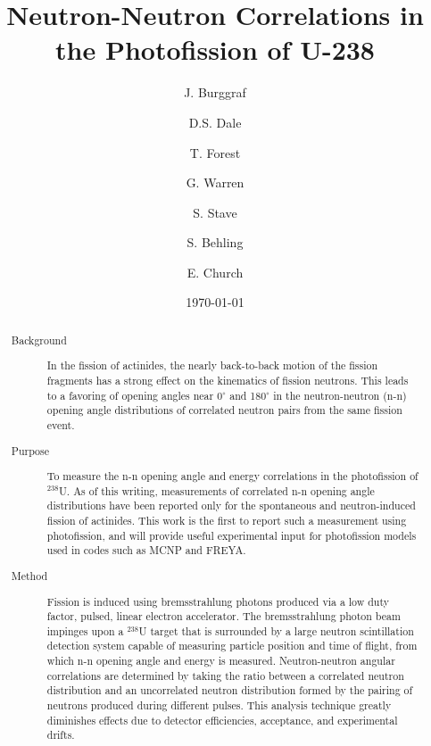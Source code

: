 \documentclass[%
 reprint,
 amsmath,amssymb,
 aps,
 nofootinbib
]{revtex4-1}
\begin{document}

\title{Neutron-Neutron Correlations in the Photofission of U-238
}


\author{J. Burggraf}
\author{D.S. Dale}
\author{T. Forest}

\author{G. Warren}
\author{S. Stave}
\author{S. Behling}
\author{E. Church}

\date{\today}
\begin{abstract}
    \begin{description}
        \item[Background] In the fission of actinides, the nearly back-to-back motion of the fission fragments has a strong effect on the kinematics of fission neutrons.
        This leads to a favoring of opening angles near 0$^{\circ}$ and 180$^{\circ}$ in the neutron-neutron (n-n) opening angle distributions of correlated neutron pairs from the same fission event.
        
        \item[Purpose] To measure the n-n opening angle and energy correlations in the photofission of $^{238}$U.
        As of this writing, measurements of correlated n-n opening angle distributions have been reported only for the spontaneous and neutron-induced fission of actinides.
        This work is the first to report such a measurement using photofission, and will provide useful experimental input for photofission models used in codes such as MCNP and FREYA.

        \item[Method] Fission is induced using bremsstrahlung photons produced via a low duty factor, pulsed, linear electron accelerator.
        The bremsstrahlung photon beam impinges upon a $^{238}$U target that is surrounded by a large neutron scintillation detection system capable of measuring particle position and time of flight, from which n-n opening angle and energy is measured.
Neutron-neutron angular correlations are determined by taking the ratio between a correlated neutron distribution and an uncorrelated neutron distribution formed by the pairing of neutrons produced during different pulses.
        This analysis technique greatly diminishes effects due to detector efficiencies, acceptance, and experimental drifts.


\end{description}
\end{abstract}
\end{document}
